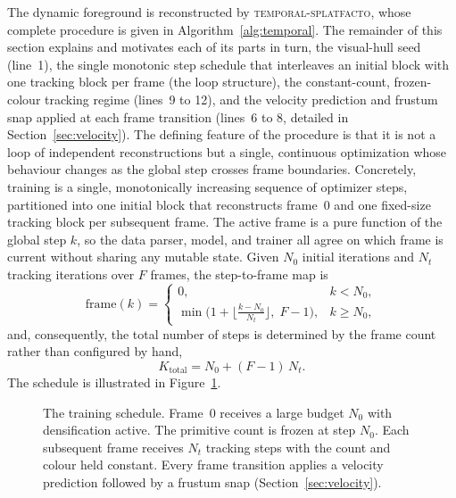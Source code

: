The dynamic foreground is reconstructed by \textsc{temporal-splatfacto}, whose
complete procedure is given in Algorithm~\ref{alg:temporal}. The remainder of this
section explains and motivates each of its parts in turn, the visual-hull seed
(line~1), the single monotonic step schedule that interleaves an initial block with
one tracking block per frame (the loop structure), the constant-count, frozen-colour
tracking regime (lines~9 to 12), and the velocity prediction and frustum snap applied
at each frame transition (lines~6 to 8, detailed in Section~\ref{sec:velocity}). The
defining feature of the procedure is that it is not a loop of independent
reconstructions but a single, continuous optimization whose behaviour changes as the
global step crosses frame boundaries. Concretely, training is a single, monotonically increasing sequence of optimizer
steps, partitioned into one initial block that reconstructs frame~$0$ and one
fixed-size tracking block per subsequent frame. The active frame is a pure
function of the global step $k$, so the data parser, model, and trainer all agree on
which frame is current without sharing any mutable state. Given $N_0$ initial
iterations and $N_t$ tracking iterations over $F$ frames, the step-to-frame map is
\begin{equation}
    \mathrm{frame}(k) =
    \begin{cases}
        0, & k < N_0, \\[2pt]
        \min\!\Big(1 + \big\lfloor \tfrac{k - N_0}{N_t} \big\rfloor,\; F-1\Big), & k \ge N_0,
    \end{cases}
    \label{eq:frameofstep}
\end{equation}
and, consequently, the total number of steps is determined by the frame count
rather than configured by hand,
\begin{equation}
    K_{\text{total}} = N_0 + (F-1)\,N_t .
    \label{eq:ktotal}
\end{equation}
The schedule is illustrated in Figure~\ref{fig:schedule}.

\begin{figure}[!ht]
    \centering
    \resizebox{0.95\linewidth}{!}{}
    \caption{The training schedule. Frame~$0$ receives a large budget $N_0$ with
    densification active. The primitive count is frozen at step $N_0$. Each subsequent
    frame receives $N_t$ tracking steps with the count and colour held constant. Every
    frame transition applies a velocity prediction followed by a frustum snap
    (Section~\ref{sec:velocity}).}
    \label{fig:schedule}
\end{figure}

